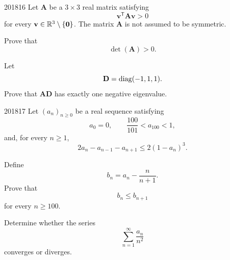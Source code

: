 \begin{problem}{2018}{1}{6}
Let $\mathbf A$ be a $3\times3$ real matrix satisfying
\[
    \mathbf v^{\mathsf T}\mathbf A\mathbf v>0
\]
for every $\mathbf v\in\mathbb{R}^3\setminus\{\mathbf0\}$. The matrix $\mathbf A$ is not assumed to be symmetric.
\begin{problemsubparts}
    \item Prove that
    \[
        \det(\mathbf A)>0.
    \]
    \item Let
    \[
        \mathbf D=\operatorname{diag}(-1, 1, 1).
    \]
    Prove that $\mathbf A\mathbf D$ has exactly one negative eigenvalue.
\end{problemsubparts}
\end{problem}

\begin{problem}{2018}{1}{7}
Let $(a_n)_{n\ge0}$ be a real sequence satisfying
\[
    a_0=0,
    \qquad
    \frac{100}{101}<a_{100}<1,
\]
and, for every $n\ge1$,
\[
    2a_n-a_{n-1}-a_{n+1}\le2(1-a_n)^3.
\]
\begin{problemsubparts}
    \item Define
    \[
        b_n=a_n-\frac{n}{n+1}.
    \]
    Prove that
    \[
        b_n\le b_{n+1}
    \]
    for every $n\ge100$.
    \item Determine whether the series
    \[
        \sum_{n=1}^{\infty}\frac{a_n}{n^2}
    \]
    converges or diverges.
\end{problemsubparts}
\end{problem}
